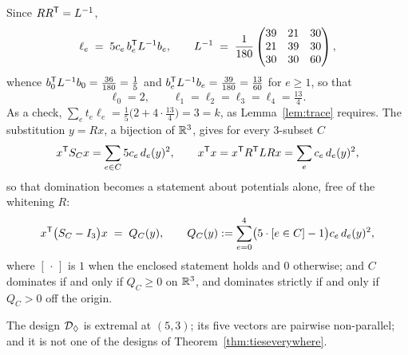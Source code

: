 Since $RR^{\mathsf{T}}=L^{-1}$,
\begin{equation}\label{eq:diamondlev}
  \ell_e\;=\;5c_e\,b_e^{\mathsf{T}} L^{-1}b_e ,
  \qquad
  L^{-1}\;=\;\frac1{180}
  \begin{pmatrix}39&21&30\\ 21&39&30\\ 30&30&60\end{pmatrix},
\end{equation}
whence $b_0^{\mathsf{T}} L^{-1}b_0=\tfrac{36}{180}=\tfrac15$ and
$b_e^{\mathsf{T}} L^{-1}b_e=\tfrac{39}{180}=\tfrac{13}{60}$ for $e\ge1$, so that
\[
  \ell_0=2,\qquad \ell_1=\ell_2=\ell_3=\ell_4=\tfrac{13}4 .
\]
As a check, $\sum_et_e\ell_e=\tfrac15\bigl(2+4\cdot\tfrac{13}4\bigr)=3=k$,
as Lemma~\ref{lem:trace} requires.  The substitution $y=Rx$, a bijection
of $\mathbb{R}^3$, gives for every $3$-subset $C$
\[
  x^{\mathsf{T}}S_{C} x=\sum_{e\in C}5c_e\,d_e(y)^{2},
  \qquad
  x^{\mathsf{T}} x=x^{\mathsf{T}} R^{\mathsf{T}} LRx=\sum_{e}c_e\,d_e(y)^{2},
\]
so that domination becomes a statement about potentials alone, free of
the whitening $R$:
\begin{equation}\label{eq:diamondgap}
  x^{\mathsf{T}}\bigl(S_{C}-I_3\bigr)x\;=\;Q_C(y),
  \qquad
  Q_C(y):=\sum_{e=0}^{4}\bigl(5\cdot[e\in C]-1\bigr)c_e\,d_e(y)^{2},
\end{equation}
where $[\,\cdot\,]$ is $1$ when the enclosed statement holds and $0$
otherwise; and $C$ dominates if and only if $Q_C\ge0$ on $\mathbb{R}^3$, and
dominates strictly if and only if $Q_C>0$ off the origin.

\begin{example}[Lean]\label{ex:diamond}
The design $\mathcal{D}_{\Diamond}$ is extremal at $(5,3)$; its five vectors are
pairwise non-parallel; and it is not one of the designs of
Theorem~\ref{thm:tieseverywhere}.
\end{example}

